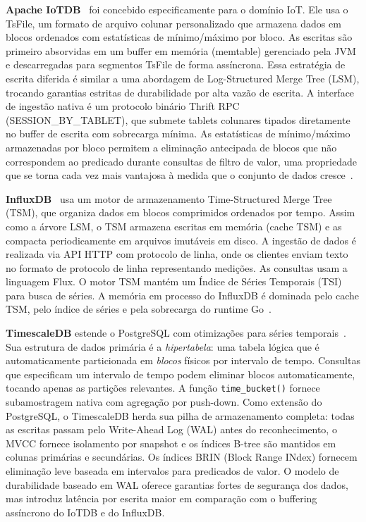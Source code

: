 \textbf{Apache IoTDB}~\cite{wang2023iotdb} foi concebido especificamente para o domínio IoT.
Ele usa o TsFile, um formato de arquivo colunar personalizado que armazena dados em blocos
ordenados com estatísticas de mínimo/máximo por bloco. As escritas são primeiro absorvidas em
um buffer em memória (memtable) gerenciado pela JVM e descarregadas para segmentos TsFile
de forma assíncrona. Essa estratégia de escrita diferida é similar a uma abordagem de
Log-Structured Merge Tree (LSM), trocando garantias estritas de durabilidade por alta vazão
de escrita. A interface de ingestão nativa é um protocolo binário Thrift RPC
(SESSION\_BY\_TABLET), que submete tablets colunares tipados diretamente no buffer de escrita
com sobrecarga mínima. As estatísticas de mínimo/máximo armazenadas por bloco permitem a
eliminação antecipada de blocos que não correspondem ao predicado durante consultas de filtro
de valor, uma propriedade que se torna cada vez mais vantajosa à medida que o conjunto de
dados cresce~\cite{wang2023iotdb}.

\textbf{InfluxDB}~\cite{naqvi2017influxdb} usa um motor de armazenamento Time-Structured Merge
Tree (TSM), que organiza dados em blocos comprimidos ordenados por tempo. Assim como a árvore
LSM, o TSM armazena escritas em memória (cache TSM) e as compacta periodicamente em arquivos
imutáveis em disco. A ingestão de dados é realizada via API HTTP com protocolo de linha, onde
os clientes enviam texto no formato de protocolo de linha representando medições. As consultas
usam a linguagem Flux. O motor TSM mantém um Índice de Séries Temporais (TSI) para busca de
séries. A memória em processo do InfluxDB é dominada pelo cache TSM, pelo índice de séries e
pela sobrecarga do runtime Go~\cite{naqvi2017influxdb}.

\textbf{TimescaleDB} estende o PostgreSQL com otimizações para séries temporais~\cite{Ramakrishnan2003}.
Sua estrutura de dados primária é a \textit{hipertabela}: uma tabela lógica que é
automaticamente particionada em \textit{blocos} físicos por intervalo de tempo. Consultas que
especificam um intervalo de tempo podem eliminar blocos automaticamente, tocando apenas as
partições relevantes. A função \texttt{time\_bucket()} fornece subamostragem nativa com
agregação por push-down. Como extensão do PostgreSQL, o TimescaleDB herda sua pilha de
armazenamento completa: todas as escritas passam pelo Write-Ahead Log (WAL) antes do
reconhecimento, o MVCC fornece isolamento por snapshot e os índices B-tree são mantidos em
colunas primárias e secundárias. Os índices BRIN (Block Range INdex) fornecem eliminação leve
baseada em intervalos para predicados de valor. O modelo de durabilidade baseado em WAL
oferece garantias fortes de segurança dos dados, mas introduz latência por escrita maior em
comparação com o buffering assíncrono do IoTDB e do InfluxDB.

